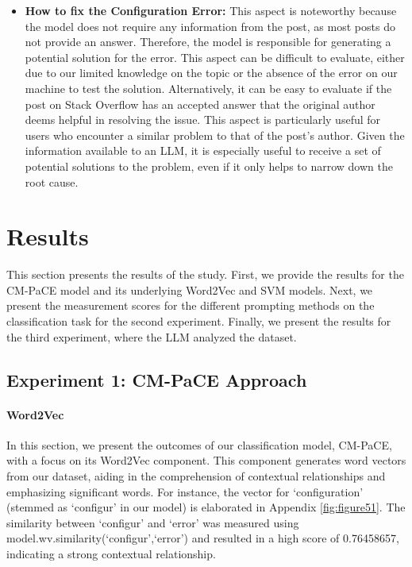 \documentclass[english,bachelor]{swsLeipzig}
\begin{document}
\begin{itemize}
  \item \textbf{How to fix the Configuration Error:} This aspect is noteworthy because the model does not require any information from the post, as most posts do not provide an answer. Therefore, the model is responsible for generating a potential solution for the error. This aspect can be difficult to evaluate, either due to our limited knowledge on the topic or the absence of the error on our machine to test the solution. Alternatively, it can be easy to evaluate if the post on Stack Overflow has an accepted answer that the original author deems helpful in resolving the issue. This aspect is particularly useful for users who encounter a similar problem to that of the post's author. Given the information available to an LLM, it is especially useful to receive a set of potential solutions to the problem, even if it only helps to narrow down the root cause.
\end{itemize}

\chapter{Results}\label{results}

This section presents the results of the study. First, we provide the results for the CM-PaCE model and its underlying Word2Vec and SVM models. Next, we present the measurement scores for the different prompting methods on the classification task for the second experiment. Finally, we present the results for the third experiment, where the LLM analyzed the dataset.\\

\section{Experiment 1: CM-PaCE Approach}

\subsubsection{Word2Vec}

In this section, we present the outcomes of our classification model, CM-PaCE, with a focus on its Word2Vec component. This component generates word vectors from our dataset, aiding in the comprehension of contextual relationships and emphasizing significant words. For instance, the vector for `configuration' (stemmed as `configur' in our model) is elaborated in Appendix 
\ref{fig:figure51}. The similarity between `configur' and `error' was measured using model.wv.similarity(`configur',`error') and resulted in a high score of 0.76458657, indicating a strong contextual relationship. 
\end{document}
